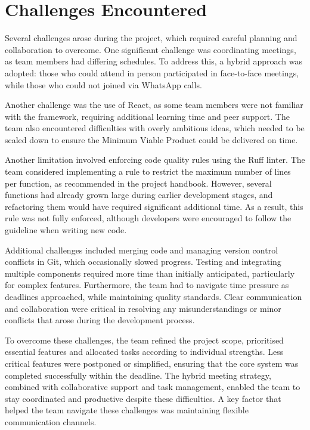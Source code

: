 \section{Challenges Encountered}
Several challenges arose during the project, which required careful planning and collaboration to overcome. One significant challenge was coordinating meetings, as team members had differing schedules. To address this, a hybrid approach was adopted: those who could attend in person participated in face-to-face meetings, while those who could not joined via WhatsApp calls. 

Another challenge was the use of React, as some team members were not familiar with the framework, requiring additional learning time and peer support. The team also encountered difficulties with overly ambitious ideas, which needed to be scaled down to ensure the Minimum Viable Product could be delivered on time.

Another limitation involved enforcing code quality rules using the Ruff linter. The team considered implementing a rule to restrict the maximum number of lines per function, as recommended in the project handbook. However, several functions had already grown large during earlier development stages, and refactoring them would have required significant additional time. As a result, this rule was not fully enforced, although developers were encouraged to follow the guideline when writing new code.

Additional challenges included merging code and managing version control conflicts in Git, which occasionally slowed progress. Testing and integrating multiple components required more time than initially anticipated, particularly for complex features. Furthermore, the team had to navigate time pressure as deadlines approached, while maintaining quality standards. Clear communication and collaboration were critical in resolving any misunderstandings or minor conflicts that arose during the development process.

To overcome these challenges, the team refined the project scope, prioritised essential features and allocated tasks according to individual strengths. Less critical features were postponed or simplified, ensuring that the core system was completed successfully within the deadline. The hybrid meeting strategy, combined with collaborative support and task management, enabled the team to stay coordinated and productive despite these difficulties. A key factor that helped the team navigate these challenges was maintaining flexible communication channels.

